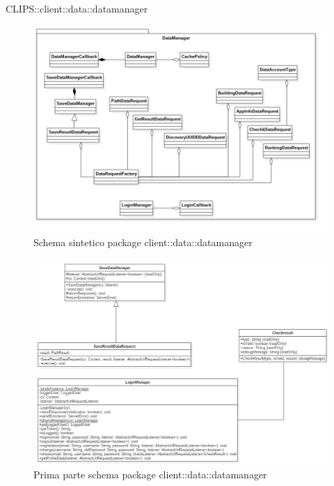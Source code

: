\begin{componente}{CLIPS::client::data::datamanager}
\begin{figure}[h!]
	\centering
	\includegraphics[scale=0.45]{img/package/png/client--datamanager--min.png}
	\caption{Schema sintetico package client::data::datamanager}
\end{figure}
\begin{figure}[h!]
\centering
\includegraphics[scale=0.5]{img/package/png/client--datamanager1.png}
\caption{Prima parte schema package client::data::datamanager}
 \end{figure}
 \begin{figure}[h!]
 	\centering

\end{figure}
\end{componente}
